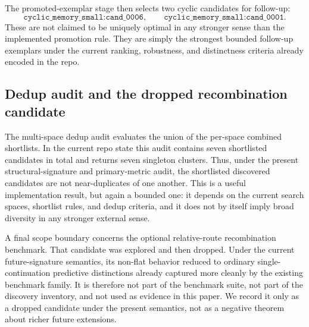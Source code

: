 \documentclass[11pt]{article}
\theoremstyle{definition}
\begin{document}
The promoted-exemplar stage then selects two cyclic candidates for follow-up:
\[
\texttt{cyclic\_memory\_small:cand\_0006},
\qquad
\texttt{cyclic\_memory\_small:cand\_0001}.
\]
These are not claimed to be uniquely optimal in any stronger sense than the implemented promotion rule. They are simply the strongest bounded follow-up exemplars under the current ranking, robustness, and distinctness criteria already encoded in the repo.

\begin{table}[H]
\centering
\caption{Promoted discovery exemplars from the tracked exemplar note.}
\label{tab:discovery-exemplars}
\footnotesize
\setlength{\tabcolsep}{4pt}
\end{table}

\subsection{Dedup audit and the dropped recombination candidate}\label{subsec:discovery-dedup}
The multi-space dedup audit evaluates the union of the per-space combined shortlists. In the current repo state this audit contains seven shortlisted candidates in total and returns seven singleton clusters. Thus, under the present structural-signature and primary-metric audit, the shortlisted discovered candidates are not near-duplicates of one another. This is a useful implementation result, but again a bounded one: it depends on the current search spaces, shortlist rules, and dedup criteria, and it does not by itself imply broad diversity in any stronger external sense.

A final scope boundary concerns the optional relative-route recombination benchmark. That candidate was explored and then dropped. Under the current future-signature semantics, its non-flat behavior reduced to ordinary single-continuation predictive distinctions already captured more cleanly by the existing benchmark family. It is therefore not part of the benchmark suite, not part of the discovery inventory, and not used as evidence in this paper. We record it only as a dropped candidate under the present semantics, not as a negative theorem about richer future extensions.
\end{document}
